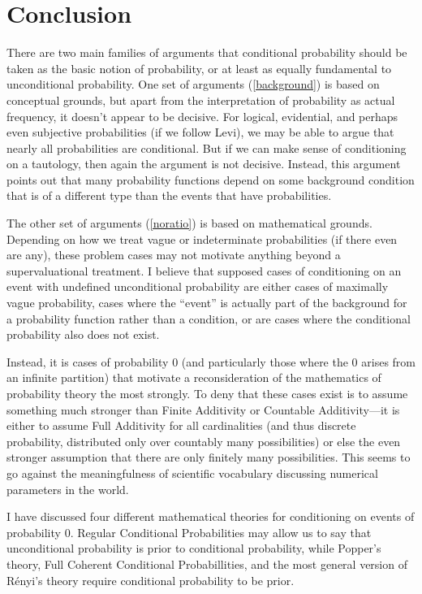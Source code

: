 \section{Conclusion}\label{conclusion}

There are two main families of arguments that conditional probability should be taken as the basic notion of probability, or at least as equally fundamental to unconditional probability. One set of arguments (\autoref{background}) is based on conceptual grounds, but apart from the interpretation of probability as actual frequency, it doesn't appear to be decisive. For logical, evidential, and perhaps even subjective probabilities (if we follow Levi), we may be able to argue that nearly all probabilities are conditional. But if we can make sense of conditioning on a tautology, then again the argument is not decisive. Instead, this argument points out that many probability functions depend on some background condition that is of a different type than the events that have probabilities.

The other set of arguments (\autoref{noratio}) is based on mathematical grounds. Depending on how we treat vague or indeterminate probabilities (if there even are any), these problem cases may not motivate anything beyond a supervaluational treatment. I believe that supposed cases of conditioning on an event with undefined unconditional probability are either cases of maximally vague probability, cases where the ``event'' is actually part of the background for a probability function rather than a condition, or are cases where the conditional probability also does not exist.

Instead, it is cases of probability $0$ (and particularly those where the $0$ arises from an infinite partition) that motivate a reconsideration of the mathematics of probability theory the most strongly. To deny that these cases exist is to assume something much stronger than Finite Additivity or Countable Additivity---it is either to assume Full Additivity for all cardinalities (and thus discrete probability, distributed only over countably many possibilities) or else the even stronger assumption that there are only finitely many possibilities. This seems to go against the meaningfulness of scientific vocabulary discussing numerical parameters in the world.

I have discussed four different mathematical theories for conditioning on events of probability $0$. Regular Conditional Probabilities may allow us to say that unconditional probability is prior to conditional probability, while Popper's theory, Full Coherent Conditional Probabillities, and the most general version of R\'{e}nyi's theory require conditional probability to be prior.

